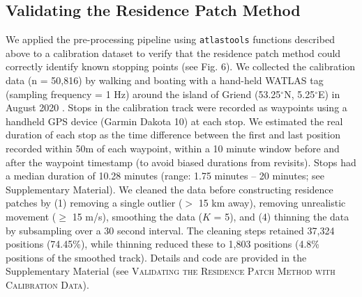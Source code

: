 \documentclass[10pt,paper=a4,headings=standardclasses
]{scrartcl}
\begin{document}
\subsection{Validating the Residence Patch Method}

We applied the pre-processing pipeline using \texttt{atlastools} functions described above to a calibration dataset to verify that the residence patch method could correctly identify known stopping points (see Fig. 6).
We collected the calibration data (n = 50,816) by walking and boating with a hand-held WATLAS tag (sampling frequency = 1 Hz) around the island of Griend (53.25$^{\circ}$N, 5.25$^{\circ}$E) in August 2020 \citep[WATLAS: Wadden Sea ATLAS system][Bijleveld et al. \textit{in prep.}]{beardsworth2021}.
Stops in the calibration track were recorded as waypoints using a handheld GPS device (Garmin Dakota 10) at each stop.
We estimated the real duration of each stop as the time difference between the first and last position recorded within 50m of each waypoint, within a 10 minute window before and after the waypoint timestamp (to avoid biased durations from revisits).
Stops had a median duration of 10.28 minutes (range: 1.75 minutes -- 20 minutes; see Supplementary Material).
We cleaned the data before constructing residence patches by (1) removing a single outlier ($>$ 15 km away), removing unrealistic movement ($\geq$ 15 m/s), smoothing the data ($K$ = 5), and (4) thinning the data by subsampling over a 30 second interval.
The cleaning steps retained 37,324 positions (74.45\%), while thinning reduced these to 1,803 positions (4.8\% positions of the smoothed track).
Details and code are provided in the Supplementary Material (see \textsc{Validating the Residence Patch Method with Calibration Data}).

\end{document}
